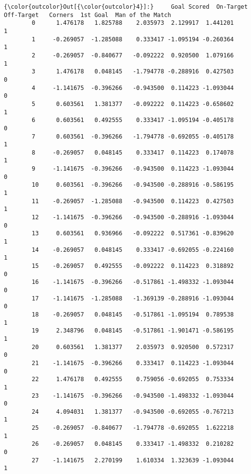\documentclass[11pt]{article}
\begin{document}
\begin{Verbatim}[commandchars=\\\{\}]
{\color{outcolor}Out[{\color{outcolor}4}]:}     Goal Scored  On-Target  Off-Target   Corners  1st Goal  Man of the Match
        0      1.476178   1.825788    2.035973  2.129917  1.441201                 1
        1     -0.269057  -1.285088    0.333417 -1.095194 -0.260364                 1
        2     -0.269057  -0.840677   -0.092222  0.920500  1.079166                 1
        3      1.476178   0.048145   -1.794778 -0.288916  0.427503                 0
        4     -1.141675  -0.396266   -0.943500  0.114223 -1.093044                 0
        5      0.603561   1.381377   -0.092222  0.114223 -0.658602                 1
        6      0.603561   0.492555    0.333417 -1.095194 -0.405178                 0
        7      0.603561  -0.396266   -1.794778 -0.692055 -0.405178                 1
        8     -0.269057   0.048145    0.333417  0.114223  0.174078                 1
        9     -1.141675  -0.396266   -0.943500  0.114223 -1.093044                 0
        10     0.603561  -0.396266   -0.943500 -0.288916 -0.586195                 1
        11    -0.269057  -1.285088   -0.943500  0.114223  0.427503                 1
        12    -1.141675  -0.396266   -0.943500 -0.288916 -1.093044                 0
        13     0.603561   0.936966   -0.092222  0.517361 -0.839620                 1
        14    -0.269057   0.048145    0.333417 -0.692055 -0.224160                 1
        15    -0.269057   0.492555   -0.092222  0.114223  0.318892                 0
        16    -1.141675  -0.396266   -0.517861 -1.498332 -1.093044                 0
        17    -1.141675  -1.285088   -1.369139 -0.288916 -1.093044                 0
        18    -0.269057   0.048145   -0.517861 -1.095194  0.789538                 1
        19     2.348796   0.048145   -0.517861 -1.901471 -0.586195                 1
        20     0.603561   1.381377    2.035973  0.920500  0.572317                 0
        21    -1.141675  -0.396266    0.333417  0.114223 -1.093044                 0
        22     1.476178   0.492555    0.759056 -0.692055  0.753334                 1
        23    -1.141675  -0.396266   -0.943500 -1.498332 -1.093044                 0
        24     4.094031   1.381377   -0.943500 -0.692055 -0.767213                 1
        25    -0.269057  -0.840677   -1.794778 -0.692055  1.622218                 1
        26    -0.269057   0.048145    0.333417 -1.498332  0.210282                 0
        27    -1.141675   2.270199    1.610334  1.323639 -1.093044                 1

\end{Verbatim}
\end{document}
